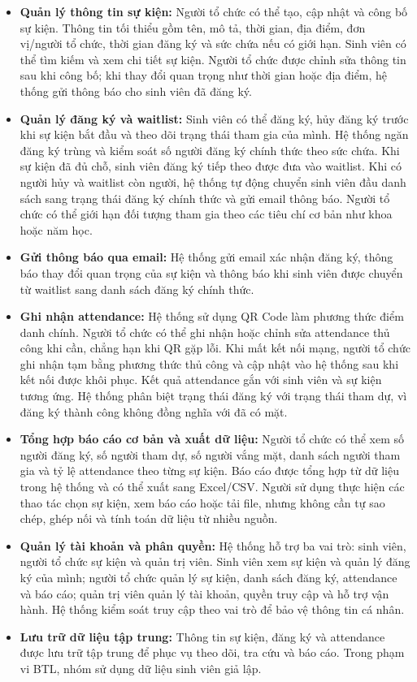 \begin{itemize}
\item \textbf{Quản lý thông tin sự kiện:} Người tổ chức có thể tạo, cập nhật và công bố sự kiện. Thông tin tối thiểu gồm tên, mô tả, thời gian, địa điểm, đơn vị/người tổ chức, thời gian đăng ký và sức chứa nếu có giới hạn. Sinh viên có thể tìm kiếm và xem chi tiết sự kiện. Người tổ chức được chỉnh sửa thông tin sau khi công bố; khi thay đổi quan trọng như thời gian hoặc địa điểm, hệ thống gửi thông báo cho sinh viên đã đăng ký.

\item \textbf{Quản lý đăng ký và waitlist:} Sinh viên có thể đăng ký, hủy đăng ký trước khi sự kiện bắt đầu và theo dõi trạng thái tham gia của mình. Hệ thống ngăn đăng ký trùng và kiểm soát số người đăng ký chính thức theo sức chứa. Khi sự kiện đã đủ chỗ, sinh viên đăng ký tiếp theo được đưa vào waitlist. Khi có người hủy và waitlist còn người, hệ thống tự động chuyển sinh viên đầu danh sách sang trạng thái đăng ký chính thức và gửi email thông báo. Người tổ chức có thể giới hạn đối tượng tham gia theo các tiêu chí cơ bản như khoa hoặc năm học.

\item \textbf{Gửi thông báo qua email:} Hệ thống gửi email xác nhận đăng ký, thông báo thay đổi quan trọng của sự kiện và thông báo khi sinh viên được chuyển từ waitlist sang danh sách đăng ký chính thức.

\item \textbf{Ghi nhận attendance:} Hệ thống sử dụng QR Code làm phương thức điểm danh chính. Người tổ chức có thể ghi nhận hoặc chỉnh sửa attendance thủ công khi cần, chẳng hạn khi QR gặp lỗi. Khi mất kết nối mạng, người tổ chức ghi nhận tạm bằng phương thức thủ công và cập nhật vào hệ thống sau khi kết nối được khôi phục. Kết quả attendance gắn với sinh viên và sự kiện tương ứng. Hệ thống phân biệt trạng thái đăng ký với trạng thái tham dự, vì đăng ký thành công không đồng nghĩa với đã có mặt.

\item \textbf{Tổng hợp báo cáo cơ bản và xuất dữ liệu:} Người tổ chức có thể xem số người đăng ký, số người tham dự, số người vắng mặt, danh sách người tham gia và tỷ lệ attendance theo từng sự kiện. Báo cáo được tổng hợp từ dữ liệu trong hệ thống và có thể xuất sang Excel/CSV. Người sử dụng thực hiện các thao tác chọn sự kiện, xem báo cáo hoặc tải file, nhưng không cần tự sao chép, ghép nối và tính toán dữ liệu từ nhiều nguồn.

\item \textbf{Quản lý tài khoản và phân quyền:} Hệ thống hỗ trợ ba vai trò: sinh viên, người tổ chức sự kiện và quản trị viên. Sinh viên xem sự kiện và quản lý đăng ký của mình; người tổ chức quản lý sự kiện, danh sách đăng ký, attendance và báo cáo; quản trị viên quản lý tài khoản, quyền truy cập và hỗ trợ vận hành. Hệ thống kiểm soát truy cập theo vai trò để bảo vệ thông tin cá nhân.

\item \textbf{Lưu trữ dữ liệu tập trung:} Thông tin sự kiện, đăng ký và attendance được lưu trữ tập trung để phục vụ theo dõi, tra cứu và báo cáo. Trong phạm vi BTL, nhóm sử dụng dữ liệu sinh viên giả lập.
\end{itemize}

